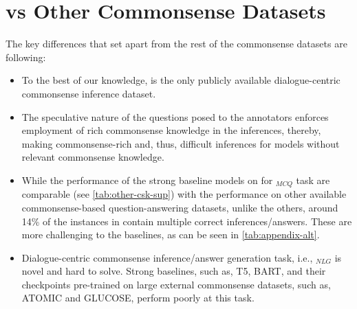 \begin{table}[h!]
\centering
\small
{}
\caption{Results of baseline models in other CSK datasets. Note: This result on \dataset{} using  is obtained for only instances with single answer. }
\label{tab:other-csk-sup}
\end{table} 
\section{\dataset{} vs Other Commonsense Datasets}
The key differences that set \dataset{} apart from the rest of the commonsense datasets are following:

\begin{itemize}
    \item To the best of our knowledge, \dataset{} is the only publicly available dialogue-centric commonsense inference dataset.
    \item The speculative nature of the questions posed to the annotators enforces employment of rich commonsense knowledge in the inferences, thereby, making \dataset{} commonsense-rich and, thus, difficult inferences for models without relevant commonsense knowledge.
    \item While the performance of the strong baseline models on \dataset{} for \dataset{}$_{MCQ}$ task are comparable (see \cref{tab:other-csk-sup}) with the performance on other available commonsense-based question-answering datasets, unlike the others, around 14\% of the instances in \dataset{} contain multiple correct inferences/answers. These are more challenging to the baselines, as can be seen in \cref{tab:appendix-alt}.
    \item Dialogue-centric commonsense inference/answer generation task, i.e., \dataset{}$_{NLG}$ is novel and hard to solve. Strong baselines, such as, T5, BART, and their checkpoints pre-trained on large external commonsense datasets, such as, ATOMIC and GLUCOSE, perform poorly at this task.
\end{itemize}

